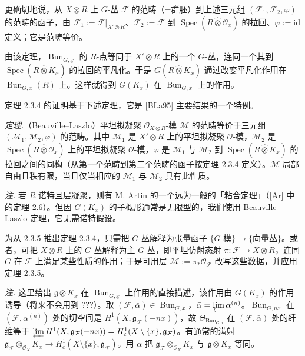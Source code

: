 更确切地说，从 $X\otimes R$ 上 $G$-丛 $\mathcal{F}$ 的范畴（=群胚）到上述三元组 $(\mathcal{F}_1,\mathcal{F}_2,\varphi)$ 的范畴的函子，由 $\mathcal{F}_1:=\mathcal{F}|_{X'\otimes R}$、$\mathcal{F}_2:=\mathcal{F}$ 到 $\operatorname{Spec}(R\widehat{\otimes}\mathcal{O}_x)$ 的拉回、$\varphi:=\mathrm{id}$ 定义；它是范畴等价。


由该定理，$\operatorname{Bun}_{G,\underline{x}}$ 的 $R$-点等同于 $X'\otimes R$ 上的一个 $G$-丛，连同一个其到 $\operatorname{Spec}(R\widehat{\otimes}K_x)$ 的拉回的平凡化。于是 $G(R\widehat{\otimes}K_x)$ 通过改变平凡化作用在 $\operatorname{Bun}_{G,\underline{x}}(R)$ 上。这样就得到 $G(K_x)$ 在 $\operatorname{Bun}_{G,\underline{x}}$ 上的作用。

定理 2.3.4 的证明基于下述定理，它是 [BLa95] 主要结果的一个特例。

 \emph{定理.}（Beauville--Laszlo）平坦拟凝聚 $\mathcal{O}_{X\otimes R}$-模 $\mathcal{M}$ 的范畴等价于三元组 $(\mathcal{M}_1,\mathcal{M}_2,\varphi)$ 的范畴。其中 $\mathcal{M}_1$ 是 $X'\otimes R$ 上的平坦拟凝聚 $\mathcal{O}$-模，$\mathcal{M}_2$ 是 $\operatorname{Spec}(R\widehat{\otimes}\mathcal{O}_x)$ 上的平坦拟凝聚 $\mathcal{O}$-模，$\varphi$ 是 $\mathcal{M}_1$ 与 $\mathcal{M}_2$ 到 $\operatorname{Spec}(R\widehat{\otimes}K_x)$ 的拉回之间的同构（从第一个范畴到第二个范畴的函子按定理 2.3.4 定义）。$\mathcal{M}$ 局部自由且秩有限，当且仅当相应的 $\mathcal{M}_1$ 与 $\mathcal{M}_2$ 具有此性质。

\emph{注.} 若 $R$ 诺特且层凝聚，则有 M. Artin 的一个远为一般的「粘合定理」（[Ar] 中的定理 2.6）。但因 $G(K_x)$ 的子概形通常是无限型的，我们使用 Beauville--Laszlo 定理，它无需诺特假设。

为从 2.3.5 推出定理 2.3.4，只需把 $G$-丛解释为张量函子 $\{G\text{-模}\}\to\{\text{向量丛}\}$。或者，可把 $X\otimes R$ 上的 $G$-丛解释为主 $G$-丛，即平坦仿射态射 $\pi:\mathcal{F}\to X\otimes R$，连同 $G$ 在 $\mathcal{F}$ 上满足某些性质的作用；于是可用层 $\mathcal{M}:=\pi_{*}\mathcal{O}_{\mathcal{F}}$ 改写这些数据，并应用定理 2.3.5。

 \emph{注.} 这里给出 $\mathfrak{g}\otimes K_x$ 在 $\operatorname{Bun}_{G,\underline{x}}$ 上作用的直接描述，该作用由 $G(K_x)$ 的作用诱导（将来不会用到 ???）。取 $(\mathcal{F},\bar\alpha)\in\operatorname{Bun}_{G,\underline{x}}$，$\bar\alpha=\varprojlim\alpha^{(n)}$。$\operatorname{Bun}_{G,nx}$ 在 $(\mathcal{F},\alpha^{(n)})$ 处的切空间是 $H^{1}(X,\mathfrak{g}_{\mathcal{F}}(-nx))$，故 $\Theta_{\operatorname{Bun}_{G,\underline{x}}}$ 在 $(\mathcal{F},\bar\alpha)$ 处的纤维等于 $\varprojlim H^{1}(X,\mathfrak{g}_{\mathcal{F}}(-nx))=H^{1}_{c}(X\setminus\{x\},\mathfrak{g}_{\mathcal{F}})$。有通常的满射 $\mathfrak{g}_{\mathcal{F}}\otimes_{\mathcal{O}_X}K_x\to H^{1}_{c}(X\setminus\{x\},\mathfrak{g}_{\mathcal{F}})$。用 $\bar\alpha$ 把 $\mathfrak{g}_{\mathcal{F}}\otimes_{\mathcal{O}_X}K_x$ 与 $\mathfrak{g}\otimes K_x$ 等同。

